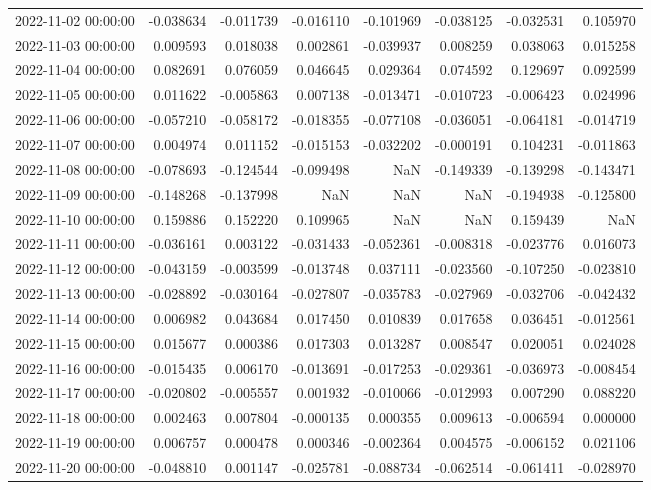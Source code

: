 \begin{tabular}{lrrrrrrr}
2022-11-02 00:00:00 & -0.038634 & -0.011739 & -0.016110 & -0.101969 & -0.038125 & -0.032531 & 0.105970 \\
2022-11-03 00:00:00 & 0.009593 & 0.018038 & 0.002861 & -0.039937 & 0.008259 & 0.038063 & 0.015258 \\
2022-11-04 00:00:00 & 0.082691 & 0.076059 & 0.046645 & 0.029364 & 0.074592 & 0.129697 & 0.092599 \\
2022-11-05 00:00:00 & 0.011622 & -0.005863 & 0.007138 & -0.013471 & -0.010723 & -0.006423 & 0.024996 \\
2022-11-06 00:00:00 & -0.057210 & -0.058172 & -0.018355 & -0.077108 & -0.036051 & -0.064181 & -0.014719 \\
2022-11-07 00:00:00 & 0.004974 & 0.011152 & -0.015153 & -0.032202 & -0.000191 & 0.104231 & -0.011863 \\
2022-11-08 00:00:00 & -0.078693 & -0.124544 & -0.099498 & NaN & -0.149339 & -0.139298 & -0.143471 \\
2022-11-09 00:00:00 & -0.148268 & -0.137998 & NaN & NaN & NaN & -0.194938 & -0.125800 \\
2022-11-10 00:00:00 & 0.159886 & 0.152220 & 0.109965 & NaN & NaN & 0.159439 & NaN \\
2022-11-11 00:00:00 & -0.036161 & 0.003122 & -0.031433 & -0.052361 & -0.008318 & -0.023776 & 0.016073 \\
2022-11-12 00:00:00 & -0.043159 & -0.003599 & -0.013748 & 0.037111 & -0.023560 & -0.107250 & -0.023810 \\
2022-11-13 00:00:00 & -0.028892 & -0.030164 & -0.027807 & -0.035783 & -0.027969 & -0.032706 & -0.042432 \\
2022-11-14 00:00:00 & 0.006982 & 0.043684 & 0.017450 & 0.010839 & 0.017658 & 0.036451 & -0.012561 \\
2022-11-15 00:00:00 & 0.015677 & 0.000386 & 0.017303 & 0.013287 & 0.008547 & 0.020051 & 0.024028 \\
2022-11-16 00:00:00 & -0.015435 & 0.006170 & -0.013691 & -0.017253 & -0.029361 & -0.036973 & -0.008454 \\
2022-11-17 00:00:00 & -0.020802 & -0.005557 & 0.001932 & -0.010066 & -0.012993 & 0.007290 & 0.088220 \\
2022-11-18 00:00:00 & 0.002463 & 0.007804 & -0.000135 & 0.000355 & 0.009613 & -0.006594 & 0.000000 \\
2022-11-19 00:00:00 & 0.006757 & 0.000478 & 0.000346 & -0.002364 & 0.004575 & -0.006152 & 0.021106 \\
2022-11-20 00:00:00 & -0.048810 & 0.001147 & -0.025781 & -0.088734 & -0.062514 & -0.061411 & -0.028970 \\

\end{tabular}
